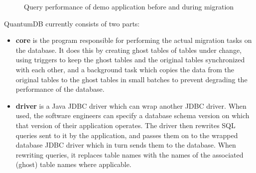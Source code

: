 \documentclass[conference]{IEEEtran}
\begin{document}
\begin{figure}%
    \centering
    \qquad
    \qquad
    \caption{Query performance of demo application before and during migration}%
    \label{fig:migration-stages}%
\end{figure}

QuantumDB currently consists of two parts: 
\begin{itemize}
  \item{\textbf{core} is the program responsible for performing the actual migration tasks on the database. It does this by creating ghost tables of tables under change, using triggers to keep the ghost tables and the original tables synchronized with each other, and a background task which copies the data from the original tables to the ghost tables in small batches to prevent degrading the performance of the database.}
  \item{\textbf{driver} is a Java JDBC driver which can wrap another JDBC driver. When used, the software engineers can specify a database schema version on which that version of their application operates. The driver then rewrites SQL queries sent to it by the application, and passes them on to the wrapped database JDBC driver which in turn sends them to the database. When rewriting queries, it replaces table names with the names of the associated (ghost) table names where applicable.}
\end{itemize}
\end{document}
